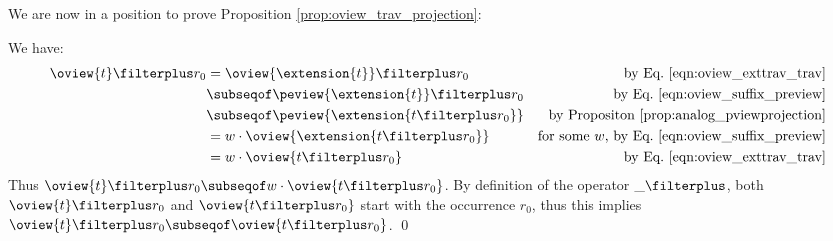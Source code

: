 We are now in a position to prove Proposition
\ref{prop:oview_trav_projection}:


We have:
\begin{align*}
  \oview{t}\filterplus r_0
        &= \oview{\extension{t}} \filterplus r_0 & \mbox{by Eq.\ \ref{eqn:oview_exttrav_trav}} \\
        &\subseqof \peview{\extension{t}} \filterplus r_0 & \mbox{by Eq.\ \ref{eqn:oview_suffix_preview}} \\
        &\subseqof \peview{\extension{t \filterplus r_0}}  & \mbox{by Propositon \ref{prop:analog_pviewprojection}} \\
        &= w \cdot \oview{\extension{t \filterplus r_0}} & \mbox{for some $w$, by Eq.\ \ref{eqn:oview_suffix_preview}} \\
        &= w \cdot \oview{t \filterplus r_0} & \mbox{by Eq.\ \ref{eqn:oview_exttrav_trav}}
\end{align*}
Thus $\oview{t}\filterplus r_0 \subseqof w \cdot \oview{t \filterplus r_0}$.
By definition of the operator $\_ \filterplus$, both
$\oview{t}\filterplus r_0$ and $\oview{t \filterplus r_0}$ start with the occurrence $r_0$, thus this implies
$\oview{t}\filterplus r_0 \subseqof \oview{t \filterplus r_0}$. \qed



